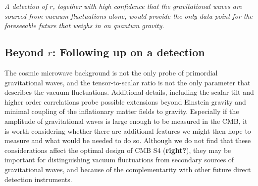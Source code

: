 {\it A detection of $r$, together with high confidence that the gravitational waves are sourced from vacuum fluctuations alone, would provide the only data point for the foreseeable future that weighs in on quantum gravity.}

\subsection{Beyond $r$: Following up on a detection}
\label{sec:beyond_r}
The cosmic microwave background is not the only probe of primordial gravitational waves, and the tensor-to-scalar ratio is not the only parameter that describes the vacuum fluctuations. Additional details, including the scalar tilt and higher order correlations probe possible extensions beyond Einstein gravity and minimal coupling of the inflationary matter fields to gravity. Especially if the amplitude of gravitational waves is large enough to be measured in the CMB, it is worth considering whether there are additional features we might then hope to measure and what would be needed to do so. Although we do not find that these considerations affect the optimal design of CMB S4 ({\bf right?}), they may be important for distinguishing vacuum fluctuations from secondary sources of gravitational waves, and because of the complementarity with other future direct detection instruments.

